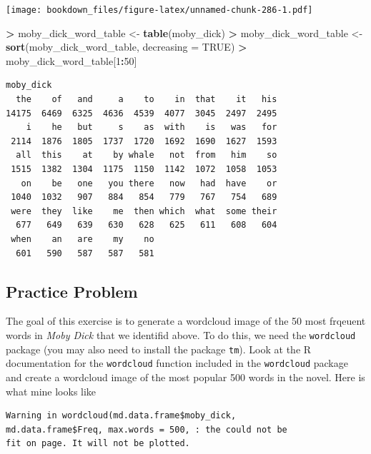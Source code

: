 \documentclass[
]{krantz}
\makeatletter
\newenvironment{Shaded}{\begin{snugshade}}{\end{snugshade}}
\newcommand{\DataTypeTok}[1]{\textcolor[rgb]{0.27,0.27,0.27}{#1}}
\newcommand{\DecValTok}[1]{\textcolor[rgb]{0.06,0.06,0.06}{#1}}
\newcommand{\KeywordTok}[1]{\textcolor[rgb]{0.27,0.27,0.27}{\textbf{#1}}}
\newcommand{\NormalTok}[1]{#1}
\newcommand{\OperatorTok}[1]{\textcolor[rgb]{0.43,0.43,0.43}{\textbf{#1}}}
\newcommand{\OtherTok}[1]{\textcolor[rgb]{0.37,0.37,0.37}{#1}}
\newcommand{\StringTok}[1]{\textcolor[rgb]{0.5,0.5,0.5}{#1}}
\newenvironment{kframe}{%
\medskip{}
\setlength{\fboxsep}{.8em}
 \def\at@end@of@kframe{}%
 \ifinner\ifhmode%
  \def\at@end@of@kframe{\end{minipage}}%
  \begin{minipage}{\columnwidth}%
 \fi\fi%
 \def\FrameCommand##1{\hskip\@totalleftmargin \hskip-\fboxsep
 \colorbox{shadecolor}{##1}\hskip-\fboxsep
     \hskip-\linewidth \hskip-\@totalleftmargin \hskip\columnwidth}%
 \MakeFramed {\advance\hsize-\width
   \@totalleftmargin\z@ \linewidth\hsize
   \@setminipage}}%
 {\par\unskip\endMakeFramed%
 \at@end@of@kframe}
\renewenvironment{Shaded}{\begin{kframe}}{\end{kframe}}
\makeatother
\begin{document}
\texttt{[image: bookdown\_files/figure-latex/unnamed-chunk-286-1.pdf]}

\begin{Shaded}
\begin{Highlighting}[]
\OperatorTok{\textgreater{}}\StringTok{ }\NormalTok{moby\_dick\_word\_table \textless{}{-}}\StringTok{ }\KeywordTok{table}\NormalTok{(moby\_dick)}
\OperatorTok{\textgreater{}}\StringTok{ }\NormalTok{moby\_dick\_word\_table \textless{}{-}}\StringTok{ }\KeywordTok{sort}\NormalTok{(moby\_dick\_word\_table, }\DataTypeTok{decreasing =} \OtherTok{TRUE}\NormalTok{)}
\OperatorTok{\textgreater{}}\StringTok{ }\NormalTok{moby\_dick\_word\_table[}\DecValTok{1}\OperatorTok{:}\DecValTok{50}\NormalTok{]}
\end{Highlighting}
\end{Shaded}

\begin{verbatim}
moby_dick
  the    of   and     a    to    in  that    it   his 
14175  6469  6325  4636  4539  4077  3045  2497  2495 
    i    he   but     s    as  with    is   was   for 
 2114  1876  1805  1737  1720  1692  1690  1627  1593 
  all  this    at    by whale   not  from   him    so 
 1515  1382  1304  1175  1150  1142  1072  1058  1053 
   on    be   one   you there   now   had  have    or 
 1040  1032   907   884   854   779   767   754   689 
 were  they  like    me  then which  what  some their 
  677   649   639   630   628   625   611   608   604 
 when    an   are    my    no 
  601   590   587   587   581 
\end{verbatim}

\hypertarget{practice-problem-15}{%
\subsection{Practice Problem}\label{practice-problem-15}}

The goal of this exercise is to generate a wordcloud image of the 50 most frqeuent words in \emph{Moby Dick} that we identifid above. To do this, we need the \texttt{wordcloud} package (you may also need to install the package \texttt{tm}). Look at the R documentation for the \texttt{wordcloud} function included in the \texttt{wordcloud} package and create a wordcloud image of the most popular 500 words in the novel. Here is what mine looks like

\begin{verbatim}
Warning in wordcloud(md.data.frame$moby_dick,
md.data.frame$Freq, max.words = 500, : the could not be
fit on page. It will not be plotted.
\end{verbatim}
\end{document}
